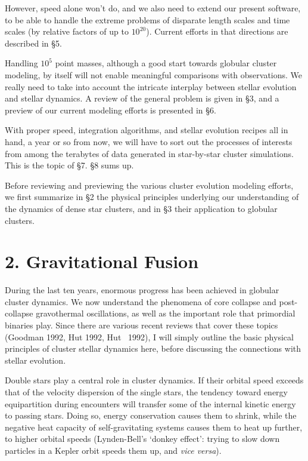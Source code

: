 However, speed alone won't do, and we also need to extend our present
software, to be able to handle the extreme problems of disparate
length scales and time scales (by relative factors of up to $10^{20}$).
Current efforts in that directions are described in \S 5.

Handling $10^5$ point masses, although a good start towards globular
cluster modeling, by itself will not enable meaningful comparisons
with observations.  We really need to take into account the intricate
interplay between stellar evolution and stellar dynamics.  A review of
the general problem is given in \S 3, and a preview of our current
modeling efforts is presented in \S 6.

With proper speed, integration algorithms, and stellar evolution
recipes all in hand, a year or so from now, we will have to sort out
the processes of interests from among the terabytes of data generated
in star-by-star cluster simulations.  This is the topic of \S 7.  \S 8
sums up.

Before reviewing and previewing the various cluster evolution modeling
efforts, we first summarize in \S 2 the physical principles underlying
our understanding of the dynamics of dense star clusters, and in \S 3
their application to globular clusters.

\section{2. Gravitational Fusion}

During the last ten years, enormous progress has been achieved in
globular cluster dynamics.  We now understand the phenomena of core
collapse and post-collapse gravothermal oscillations, as well as the
important role that primordial binaries play.  Since there are various
recent reviews that cover these topics (\eg Goodman 1992, Hut 1992,
Hut \etal\ 1992), I will simply outline the basic physical principles of
cluster stellar dynamics here, before discussing the connections
with stellar evolution.

Double stars play a central role in cluster dynamics.  If their
orbital speed exceeds that of the velocity dispersion of the single
stars, the tendency toward energy equipartition during encounters will
transfer some of the internal kinetic energy to passing stars.
Doing so, energy conservation causes them to shrink, while the
negative heat capacity of self-gravitating systems causes them to heat
up further, to higher orbital speeds (Lynden-Bell's `donkey effect':
trying to slow down particles in a Kepler orbit speeds them up, and
{\it vice versa}).

